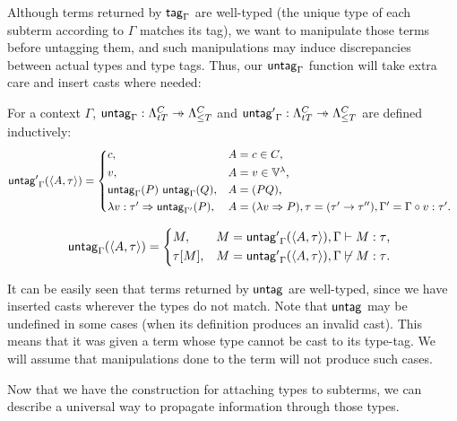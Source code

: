 \documentclass[main.tex]{subfiles}
\begin{document}
Although terms returned by $\mathsf{tag}_{\Gamma}$ are well-typed (the unique type of
each subterm according to $\Gamma$ matches its tag), we want to manipulate
those terms before untagging them, and such manipulations may induce discrepancies
between actual types and type tags. Thus, our $\mathsf{untag}_{\Gamma}$ function
will take extra care and insert casts where needed:
\begin{defn}
    For a context $\Gamma$,
    $\mcf{untag}_{\Gamma} : \ttlambda{T}{C} \pfun \fancylambda{T}{C}$
    and
    $\mcf{untag'}_{\Gamma} : \ttlambda{T}{C} \pfun \fancylambda{T}{C}$
    are defined inductively:
    \[
        \mcf{untag'}_{\Gamma}(\ttt{A}{\tau}) =
        \begin{cases*}
            c ,& $A = c \in C$, \\
            v ,& $A = v \in \lvars$, \\
            \mcf{untag}_{\Gamma}(P) \app \mcf{untag}_{\Gamma}(Q)
 ,& $A = (PQ)$, \\
            \lambda v : \tau' \abstr \mcf{untag}_{\Gamma'}(P)
 ,& $A = (\lambda v \abstr P), \tau = (\tau' \tot \tau'')
                 , \Gamma' = \Gamma \circ v : \tau'$. \\
        \end{cases*}
    \]

    \[
        \mcf{untag}_{\Gamma}(\ttt{A}{\tau}) =
        \begin{cases*}
            M ,& $M = \mcf{untag'}_{\Gamma}(\ttt{A}{\tau}), \Gamma \vdash M : \tau$, \\
            \tau[M] ,& $M = \mcf{untag'}_{\Gamma}(\ttt{A}{\tau}), \Gamma \not\vdash M : \tau$. \\
        \end{cases*}
    \]
\end{defn}

It can be easily seen that terms returned by $\mathsf{untag}$ are well-typed,
since we have inserted casts wherever the types do not match. Note that $\mathsf{untag}$
may be undefined in some cases (when its definition produces an invalid cast).
This means that it was given a term whose type cannot be cast to its type-tag.
We will assume that manipulations done to the term will not produce such cases.

Now that we have the construction for attaching types to subterms, we can
describe a universal way to propagate information through those types.
\end{document}
